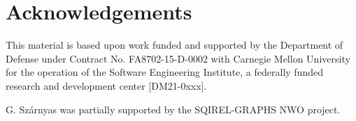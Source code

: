 \section*{Acknowledgements}


This material is based upon work funded and supported by the Department of
Defense under Contract No. FA8702-15-D-0002 with Carnegie Mellon University for
the operation of the Software Engineering Institute, a federally funded research
and development center [DM21-0xxx].

G. Sz\'arnyas was partially supported by the SQIREL-GRAPHS NWO project.
